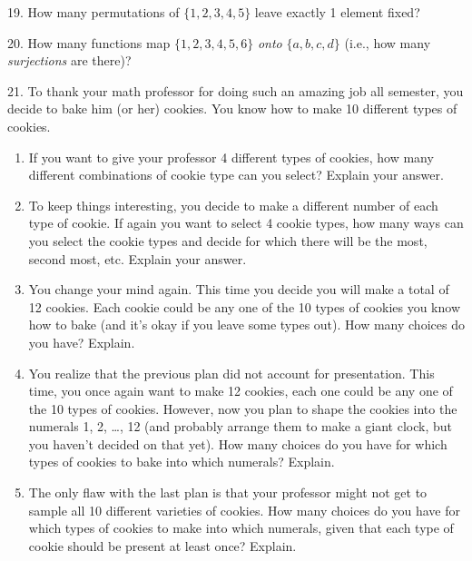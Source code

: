 \documentclass[10pt,]{book}
\theoremstyle{plain}
\theoremstyle{definition}
\theoremstyle{definition}
\theoremstyle{definition}
\numberwithin{equation}{chapter}
\begin{document}
\begin{exerciselist}
\par\smallskip
\item[19.]\hypertarget{exercise-120}{}
            How many permutations of \(\{1,2,3,4,5\}\) leave exactly 1 element fixed?
\par\smallskip
\item[20.]\hypertarget{exercise-121}{}
            How many functions map \(\{1,2,3,4,5,6\}\) \emph{onto} \(\{a,b,c,d\}\) (i.e., how many \emph{surjections} are there)?
\par\smallskip
\item[21.]\hypertarget{exr_cookie-counting}{}
            To thank your math professor for doing such an amazing job all semester, you decide to bake him (or her) cookies. You know how to make 10 different types of cookies.
          \leavevmode%
\begin{enumerate}[label=(\alph*)]
\item\hypertarget{li-761}{}
                If you want to give your professor 4 different types of cookies, how many different combinations of cookie type can you select? Explain your answer.
\item\hypertarget{li-762}{}
                To keep things interesting, you decide to make a different number of each type of cookie. If again you want to select 4 cookie types, how many ways can you select the cookie types and decide for which there will be the most, second most, etc. Explain your answer.
\item\hypertarget{li-763}{}
                You change your mind again. This time you decide you will make a total of 12 cookies. Each cookie could be any one of the 10 types of cookies you know how to bake (and it's okay if you leave some types out). How many choices do you have? Explain.
\item\hypertarget{li-764}{}
                You realize that the previous plan did not account for presentation. This time, you once again want to make 12 cookies, each one could be any one of the 10 types of cookies. However, now you plan to shape the cookies into the numerals 1, 2,
                \dots{}, 12 (and probably arrange them to make a giant clock, but you haven't decided on that yet). How many choices do you have for which types of cookies to bake into which numerals? Explain.
\item\hypertarget{li-765}{}
                The only flaw with the last plan is that your professor might not get to sample all 10 different varieties of cookies. How many choices do you have for which types of cookies to make into which numerals, given that each type of cookie should be present at least once? Explain.
\end{enumerate}


\end{exerciselist}
\end{document}
